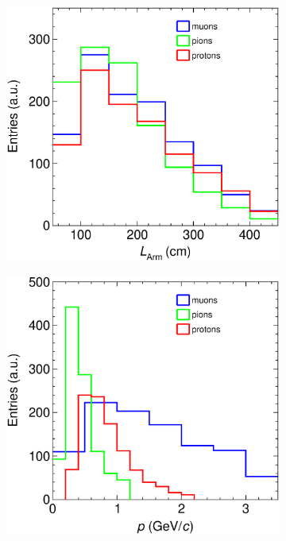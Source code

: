 \begin{figure}[t]
\begin{subfigure}[b]{0.32\textwidth}
         \caption{}
         \label{fig:GAr_Nparticles}
     \end{subfigure}
     \begin{subfigure}[b]{0.32\textwidth}
         \centering
         \includegraphics[width=\textwidth]{figures/ch6-TKI/Properties/ALICEStRecoGAr_lArmMCparticles.eps}
         \caption{}
    \label{fig:GAr_lArmMCparticles}
     \end{subfigure}
     \begin{subfigure}[b]{0.32\textwidth}
         \centering
         \includegraphics[width=\textwidth]{figures/ch6-TKI/Properties/ALICEStRecoGAr_pparticles.eps}

\end{subfigure}
\end{figure}
